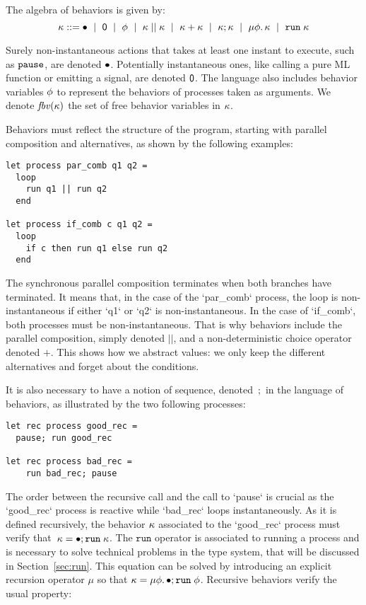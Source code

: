 \documentclass[9pt,preprint]{sigplanconf}
\newcommand{\sdeq}{::=}
\begin{document}
The algebra of behaviors is given by:
\[
\rk \sdeq \effplus ~\mid~ \effmin ~\mid~ \effvar ~\mid~ \effpar{\rk}{\rk} ~\mid~ \effor{\rk}{\rk}
~\mid~ \effcon{\rk}{\rk}  ~\mid~ \effrec{\effvar}{\rk}  ~\mid~ \effrun{\rk}
\]

Surely non-instantaneous actions that takes at least one instant to execute, such as $\mathtt{pause}$, are denoted $\bullet$. Potentially instantaneous ones, like calling a pure ML function or emitting a signal, are denoted $\textsf{0}$. The language also includes behavior variables $\phi$ to represent the behaviors of processes taken as arguments. We denote $\mathit{fbv}(\kappa)$ the set of free behavior variables in $\kappa$.

Behaviors must reflect the structure of the program, starting with parallel composition and alternatives, as shown by the following examples: 
\begin{lstlisting}
let process par_comb q1 q2 =
  loop
    run q1 || run q2
  end

let process if_comb c q1 q2 =
  loop
    if c then run q1 else run q2
  end
\end{lstlisting}
The synchronous parallel composition terminates when both bran\-ches have terminated. It means that, in the case of the `par_comb` process, the loop is non-instantaneous if either `q1` or `q2` is non-instantaneous. In the case of `if_comb`, both processes must be non-instantaneous. That is why behaviors include the parallel composition, simply denoted $||$, and a non-deterministic choice operator denoted $+$. This shows how  we abstract values: we only keep the different alternatives and forget about the conditions.

It is also necessary to have a notion of sequence, denoted~$;$ in the language of behaviors, as illustrated by the two following processes:
\begin{lstlisting}
let rec process good_rec =
  pause; run good_rec

let rec process bad_rec =
    run bad_rec; pause
\end{lstlisting}
The order between the recursive call and the call to `pause` is crucial as the `good_rec` process is reactive while `bad_rec` loops instantaneously.
%
As it is defined recursively, the behavior  $\kappa$  associated to the `good_rec` process must verify that~\mbox{$ \kappa = \bullet ; \mathtt{run}\; \kappa$}. The $\mathtt{run}$ operator is associated to running a process and is necessary to solve technical problems in the type system, that will be discussed in Section~\ref{sec:run}. This equation can be solved by introducing an explicit recursion operator $\mu$ so that $\kappa = \mu \phi.\, \bullet ; \mathtt{run}\; \phi$. Recursive behaviors verify the usual property:
\end{document}

